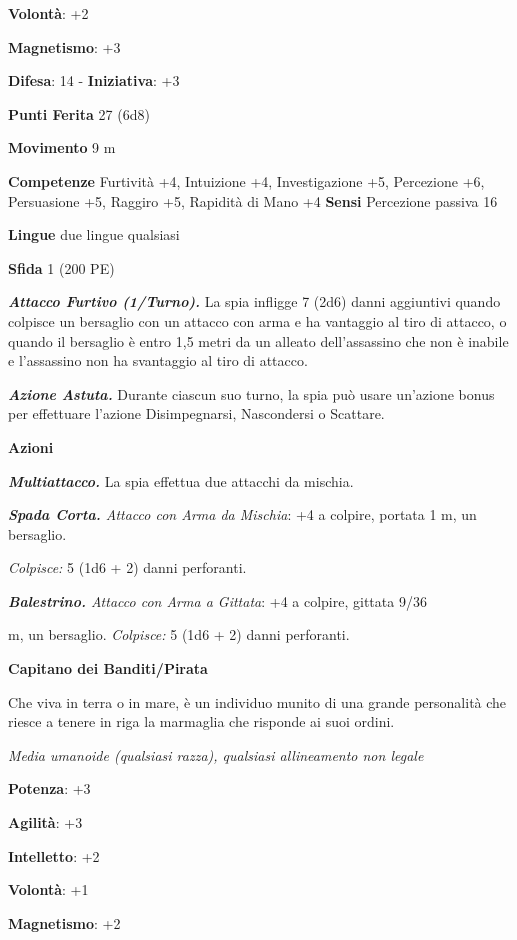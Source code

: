 \begin{multicols}{2}
\textbf{Volontà}: +2

\textbf{Magnetismo}: +3

\textbf{Difesa}: 14 - \textbf{Iniziativa}: +3

\textbf{Punti Ferita} 27 (6d8)

\textbf{Movimento} 9 m

\textbf{Competenze} Furtività +4, Intuizione +4, Investigazione +5,
Percezione +6, Persuasione +5, Raggiro +5, Rapidità di Mano +4
\textbf{Sensi} Percezione passiva 16

\textbf{Lingue} due lingue qualsiasi

\textbf{Sfida} 1 (200 PE)\smallskip

\emph{\textbf{Attacco Furtivo (1/Turno).}} La spia infligge 7 (2d6)
danni aggiuntivi quando colpisce un bersaglio con un attacco con arma e
ha vantaggio al tiro di attacco, o quando il bersaglio è entro 1,5 metri
da un alleato dell'assassino che non è inabile e l'assassino non ha
svantaggio al tiro di attacco.

\emph{\textbf{Azione Astuta.}} Durante ciascun suo turno, la spia può
usare un'azione bonus per effettuare l'azione Disimpegnarsi, Nascondersi
o Scattare.

\smallskip\textbf{Azioni}

\emph{\textbf{Multiattacco.}} La spia effettua due attacchi da mischia.

\emph{\textbf{Spada Corta.} Attacco con Arma da Mischia}: +4 a colpire,
portata 1 m, un bersaglio.

\emph{Colpisce:} 5 (1d6 + 2) danni perforanti.

\emph{\textbf{Balestrino.} Attacco con Arma a Gittata}: +4 a colpire,
gittata 9/36

m, un bersaglio. \emph{Colpisce:} 5 (1d6 + 2) danni perforanti.



\textbf{Capitano dei Banditi/Pirata}

Che viva in terra o in mare, è un individuo munito di una grande
personalità che riesce a tenere in riga la marmaglia che risponde ai
suoi ordini.

\emph{Media umanoide (qualsiasi razza), qualsiasi allineamento non
legale}

\textbf{Potenza}: +3

\textbf{Agilità}: +3

\textbf{Intelletto}: +2

\textbf{Volontà}: +1

\textbf{Magnetismo}: +2


\end{multicols}
